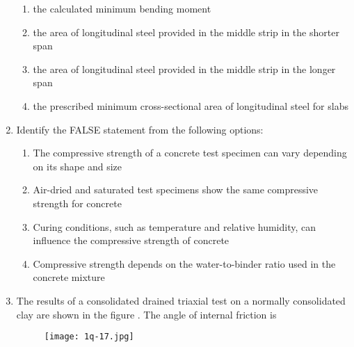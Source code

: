 \documentclass[journal,12pt,onecolumn]{article}
\theoremstyle{remark}
\begin{document}
\begin{enumerate}
\hfill{}
\begin{enumerate}
    \item the calculated minimum bending moment
    \item the area of longitudinal steel provided in the middle strip in the shorter span
    \item the area of longitudinal steel provided in the middle strip in the longer span
    \item the prescribed minimum cross-sectional area of longitudinal steel for slabs
\end{enumerate}

\item Identify the FALSE statement from the following options:

\hfill{}
\begin{enumerate}
    \item The compressive strength of a concrete test specimen can vary depending on its shape and size
    \item Air-dried and saturated test specimens show the same compressive strength for concrete
    \item Curing conditions, such as temperature and relative humidity, can influence the compressive strength of concrete
    \item Compressive strength depends on the water-to-binder ratio used in the concrete mixture
\end{enumerate}

\item The results of a consolidated drained triaxial test on a normally consolidated clay are shown in the figure . The angle of internal friction is
\begin{figure}[H]
    \centering
    \texttt{[image: 1q-17.jpg]}
    \caption{}
    \label{fig:q17}
\end{figure}

\hfill{}
\begin{enumerate}
\end{enumerate}


\end{enumerate}
\end{document}
